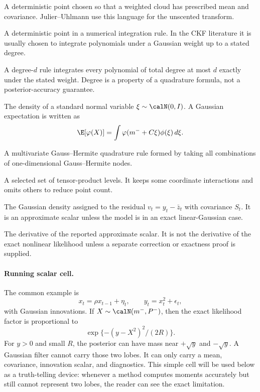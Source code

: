 \begin{description}[leftmargin=0.25in]
  \item[Sigma point.] A deterministic point chosen so that a weighted cloud has
  prescribed mean and covariance.  Julier--Uhlmann use this language for the
  unscented transform.
  \item[Cubature point.] A deterministic point in a numerical integration rule.
  In the CKF literature it is usually chosen to integrate polynomials under a
  Gaussian weight up to a stated degree.
  \item[Degree.] A degree-\(d\) rule integrates every polynomial of total degree
  at most \(d\) exactly under the stated weight.  Degree is a property of a
  quadrature formula, not a posterior-accuracy guarantee.
  \item[Gaussian weight.] The density of a standard normal variable
  \(\xi\sim\calN(0,I)\).  A Gaussian expectation is written as
  \[
    \E[\varphi(X)]
    =
    \int \varphi(m^-+C\xi)\phi(\xi)\,d\xi .
  \]
  \item[Tensor-product GHQ.] A multivariate Gauss--Hermite quadrature rule
  formed by taking all combinations of one-dimensional Gauss--Hermite nodes.
  \item[Sparse-grid index set.] A selected set of tensor-product levels.  It
  keeps some coordinate interactions and omits others to reduce point count.
  \item[Innovation likelihood.] The Gaussian density assigned to the residual
  \(v_t=y_t-\bar z_t\) with covariance \(S_t\).  It is an approximate scalar
  unless the model is in an exact linear-Gaussian case.
  \item[Approximate score.] The derivative of the reported approximate scalar.
  It is not the derivative of the exact nonlinear likelihood unless a separate
  correction or exactness proof is supplied.
\end{description}

\paragraph{Running scalar cell.}
The common example is
\begin{equation}
  x_t=\rho x_{t-1}+\eta_t,\qquad y_t=x_t^2+\epsilon_t,
  \label{eq:bf-hd-gq-running-cell}
\end{equation}
with Gaussian innovations.  If \(X\sim\calN(m^-,P^-)\), then the exact
likelihood factor is proportional to
\[
  \exp\{-(y-X^2)^2/(2R)\}.
\]
For \(y>0\) and small \(R\), the posterior can have mass near
\(+\sqrt y\) and \(-\sqrt y\).  A Gaussian filter cannot carry those two lobes.
It can only carry a mean, covariance, innovation scalar, and diagnostics.  This
simple cell will be used below as a truth-telling device: whenever a method
computes moments accurately but still cannot represent two lobes, the reader can
see the exact limitation.

